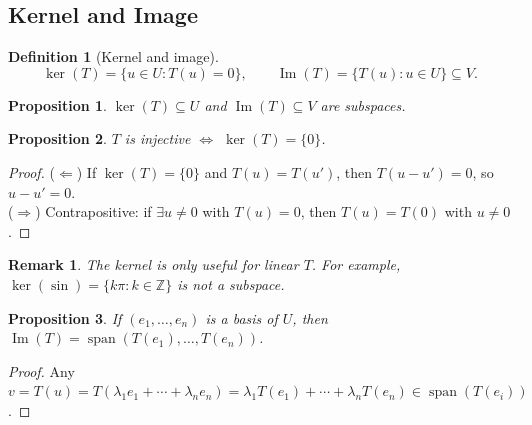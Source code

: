 \documentclass{article}
\newtheorem{definition}{Definition}
\newtheorem{remark}{Remark}
\newtheorem{proposition}{Proposition}
\newcommand{\Span}{\operatorname{span}}
\begin{document}
\subsection{Kernel and Image}

\begin{definition}[Kernel and image]
    \[\ker(T) = \{u\in U : T(u)=0\}, \qquad \operatorname{Im}(T) = \{T(u) : u\in U\}\subseteq V.\]
\end{definition}
\begin{proposition}
    $\ker(T)\subseteq U$ and $\operatorname{Im}(T)\subseteq V$ are subspaces.
\end{proposition}
\begin{proposition}
    $T$ is injective $\iff$ $\ker(T)=\{0\}$.
\end{proposition}
\begin{proof}
    ($\Leftarrow$) If $\ker(T)=\{0\}$ and $T(u)=T(u')$, then $T(u-u')=0$, so $u-u'=0$.\\
    ($\Rightarrow$) Contrapositive: if $\exists u\neq0$ with $T(u)=0$, then $T(u)=T(0)$ with $u\neq0$.
\end{proof}
\begin{remark}
    The kernel is only useful for linear $T$. For example, $\ker(\sin)=\{k\pi : k\in\mathbb{Z}\}$ is not a subspace.
\end{remark}
\begin{proposition}
    If $(e_1,\ldots,e_n)$ is a basis of $U$, then $\operatorname{Im}(T)=\Span(T(e_1),\ldots,T(e_n))$.
\end{proposition}
\begin{proof}
    Any $v=T(u)=T(\lambda_1e_1+\cdots+\lambda_ne_n) = \lambda_1T(e_1)+\cdots+\lambda_nT(e_n)\in\Span(T(e_i))$.
\end{proof}
\end{document}
